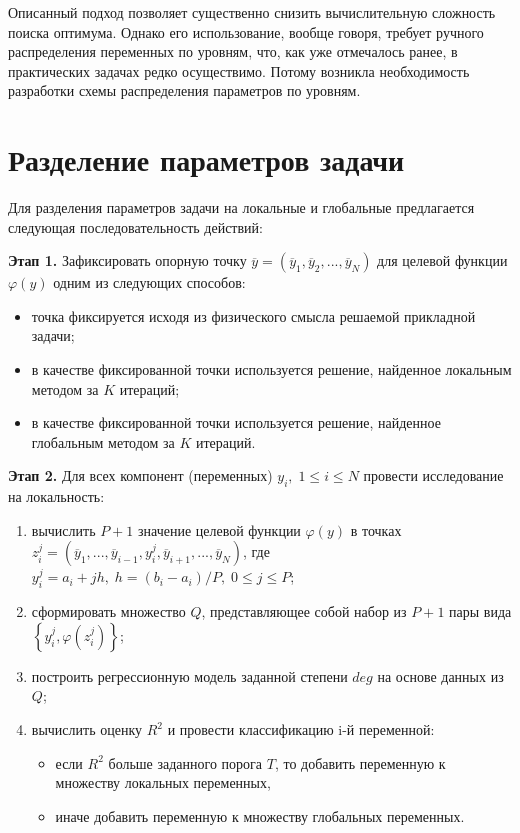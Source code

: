 \documentclass[11pt, oneside, a4paper]{article}
\begin{document}
Описанный подход позволяет существенно снизить вычислительную сложность поиска оптимума. Однако его использование, вообще говоря, требует ручного распределения переменных по уровням, что, как уже отмечалось ранее, в практических задачах редко осуществимо. Потому возникла необходимость разработки схемы распределения параметров по уровням.

\section{Разделение параметров задачи}

Для разделения параметров задачи на локальные и глобальные предлагается следующая последовательность действий:

\textbf{Этап 1.} Зафиксировать опорную точку $\overline{y} = (\overline{y}_1, \overline{y}_2,...,\overline{y}_N)$ для целевой функции $\varphi(y)$ одним из следующих способов:
\begin{itemize}
\item точка фиксируется исходя из физического смысла решаемой прикладной задачи;
\item в качестве фиксированной точки используется решение, найденное локальным методом за $K$ итераций;
\item в качестве фиксированной точки используется решение, найденное глобальным методом за $K$ итераций.
\end{itemize}

\textbf{Этап 2.} Для всех компонент (переменных) $y_i, \; 1\leq i \leq N$ провести исследование на локальность:
\begin{enumerate}
\item вычислить $P+1$ значение целевой функции $\varphi(y)$ в точках $z_i^j = (\overline{y}_1,...,\overline{y}_{i-1},y_i^j,\overline{y}_{i+1},...,\overline{y}_N)$, где
$y_i^j =  a_i + jh, \; h=(b_i-a_i)/P, \; 0\leq j \leq P$;
\item сформировать множество $Q$, представляющее собой набор из $P+1$ пары вида $\left\{y_i^j, \varphi(z_i^j)\right\} $;
\item построить регрессионную модель заданной степени $deg$ на основе данных из $Q$;
\item вычислить оценку $R^2$ и провести классификацию i-й переменной:
\begin{itemize}
\item если $R^2$ больше заданного порога $T$, то добавить переменную к множеству локальных переменных,
\item иначе добавить переменную к множеству глобальных переменных.
\end{itemize}
\end{enumerate}
\end{document}
